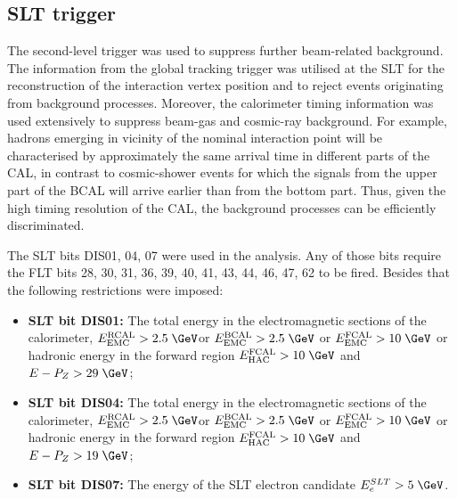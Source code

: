 \subsection{SLT trigger}
\label{subsec:sltcuts}
The second-level trigger was used to suppress further beam-related background. The information from the \zeus global tracking trigger was utilised at the SLT for the reconstruction of the interaction vertex position and to reject events originating from background processes. Moreover, the calorimeter timing information was used extensively to suppress beam-gas and cosmic-ray background. For example, hadrons emerging in vicinity of the nominal interaction point will be characterised by approximately the same arrival time in different parts of the CAL, in contrast to cosmic-shower events for which the signals from the upper part of the BCAL will arrive earlier than from the bottom part. Thus, given the high timing resolution of the CAL, the background processes can be efficiently discriminated.

The SLT bits DIS01, 04, 07 were used in the analysis. Any of those bits require the FLT bits 28, 30, 31, 36, 39, 40, 41, 43, 44, 46, 47, 62 to be fired. Besides that the following restrictions were imposed:
\begin{itemize}
	\item \textbf{SLT bit DIS01:} The total energy in the electromagnetic sections of the calorimeter, $E_\text{EMC}^\text{RCAL} > 2.5\;\GeV$or $E_\text{EMC}^\text{BCAL} > 2.5\;\GeV$ or $E_\text{EMC}^\text{FCAL} > 10\;\GeV$ or hadronic energy in the forward region $E_\text{HAC}^\text{FCAL} > 10\;\GeV$ and $E-P_Z > 29\;\GeV$;
	\item \textbf{SLT bit DIS04:} The total energy in the electromagnetic sections of the calorimeter, $E_\text{EMC}^\text{RCAL} > 2.5\;\GeV$or $E_\text{EMC}^\text{BCAL} > 2.5\;\GeV$ or $E_\text{EMC}^\text{FCAL} > 10\;\GeV$ or hadronic energy in the forward region $E_\text{HAC}^\text{FCAL} > 10\;\GeV$ and $E-P_Z > 19\;\GeV$;
	\item \textbf{SLT bit DIS07:} The energy of the SLT electron candidate $E_e^{SLT}>5\;\GeV$.
\end{itemize}
